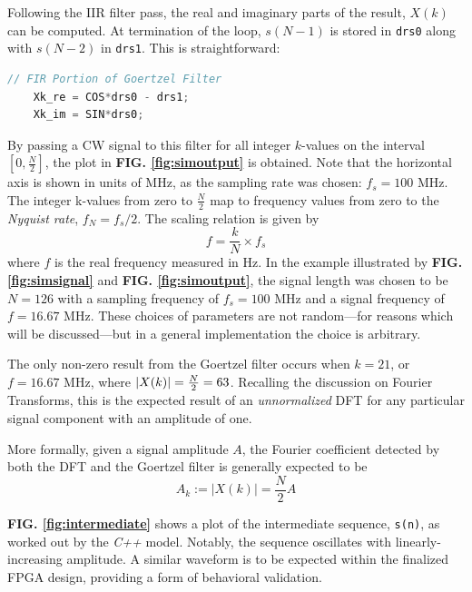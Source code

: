 \documentclass[reprint,amsmath,amssymb,aps,pra]{revtex4-2}
\begin{document}
Following the IIR filter pass, the real and imaginary parts of the result, $X(k)$ can be computed. At termination of the loop, $s(N-1)$ is stored in \verb+drs0+ along with $s(N-2)$ in \verb+drs1+. This is straightforward:
\begin{lstlisting}[language=C++]
    // FIR Portion of Goertzel Filter
    Xk_re = COS*drs0 - drs1;
    Xk_im = SIN*drs0;
\end{lstlisting}

By passing a CW signal to this filter for all integer $k$-values on the interval $[0, \frac{N}{2}]$, the plot in \textbf{FIG. \ref{fig:simoutput}} is obtained. Note that the horizontal axis is shown in units of MHz, as the sampling rate was chosen: $f_s = 100$ MHz. The integer k-values from zero to $\frac{N}{2}$ map to frequency values from zero to the \textit{Nyquist rate}, $f_{N} = f_s/2$. The scaling relation is given by
\begin{equation}
    f = \frac{k}{N} \times f_s
\end{equation}
where $f$ is the real frequency measured in Hz. In the example illustrated by \textbf{FIG. \ref{fig:simsignal}} and \textbf{FIG. \ref{fig:simoutput}}, the signal length was chosen to be $N = 126$ with a sampling frequency of $f_s = 100$ MHz and a signal frequency of $f = 16.67$ MHz. These choices of parameters are not random---for reasons which will be discussed---but in a general implementation the choice is arbitrary. 

\bigskip

The only non-zero result from the Goertzel filter occurs when $k = 21$, or $f = 16.67$ MHz, where $\abs{X(k)} = \frac{N}{2} =  63$. Recalling the discussion on Fourier Transforms, this is the expected result of an \textit{unnormalized} DFT for any particular signal component with an amplitude of one.

More formally, given a signal amplitude $A$, the Fourier coefficient detected by both the DFT and the Goertzel filter is generally expected to be
\begin{equation}
    A_k :=|X(k)| = \frac{N}{2}A
\end{equation}

\bigskip

\textbf{FIG. \ref{fig:intermediate}} shows a plot of the intermediate sequence, \verb+s(n)+, as worked out by the \textit{C++} model. Notably, the sequence oscillates with linearly-increasing amplitude. A similar waveform is to be expected within the finalized FPGA design, providing a form of behavioral validation.
\end{document}
